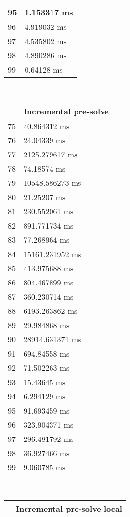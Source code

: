 \begin{multicols}{2}
\begin{tabular}{|l|l|}
		95 & 1.153317 ms \\ \hline
		96 & 4.919032 ms \\ \hline
		97 & 4.535802 ms \\ \hline
		98 & 4.890286 ms \\ \hline
		99 & 0.64128 ms \\ \hline
	\end{tabular}\\
	\begin{tabular}{|l|l|}
		\hline
		& Incremental pre-solve \\ \hline
		75 & 40.864312 ms \\ \hline
		76 & 24.04339 ms \\ \hline
		77 & 2125.279617 ms \\ \hline
		78 & 74.18574 ms \\ \hline
		79 & 10548.586273 ms \\ \hline
		80 & 21.25207 ms \\ \hline
		81 & 230.552061 ms \\ \hline
		82 & 891.771734 ms \\ \hline
		83 & 77.268964 ms \\ \hline
		84 & 15161.231952 ms \\ \hline
		85 & 413.975688 ms \\ \hline
		86 & 804.467899 ms \\ \hline
		87 & 360.230714 ms \\ \hline
		88 & 6193.263862 ms \\ \hline
		89 & 29.984868 ms \\ \hline
		90 & 28914.631371 ms \\ \hline
		91 & 694.84558 ms \\ \hline
		92 & 71.502263 ms \\ \hline
		93 & 15.43645 ms \\ \hline
		94 & 6.294129 ms \\ \hline
		95 & 91.693459 ms \\ \hline
		96 & 323.904371 ms \\ \hline
		97 & 296.481792 ms \\ \hline
		98 & 36.927466 ms \\ \hline
		99 & 9.060785 ms \\ \hline
	\end{tabular}\\
	\begin{tabular}{|l|l|}
		\hline
		& Incremental pre-solve local \\ \hline

\end{tabular}
\end{multicols}
